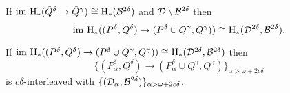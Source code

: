 
\begin{lemma}
    If $\mathrm{im}~\mathrm{H}_*(\hat{Q}^\delta\to\hat{Q}^\gamma)\cong\mathrm{H}_*({\mathcal{B}}^{2\delta})$ and ${\mathcal{D}}\setminus{\mathcal{B}}^{2\delta}$ then
    \[\mathrm{im}~\mathrm{H}_*((P^\delta, Q^\delta)\to (P^\delta\cup Q^\gamma, Q^\gamma))\cong \mathrm{H}_*({\mathcal{D}}^{2\delta}, {\mathcal{B}}^{2\delta}). \]
\end{lemma}

\begin{theorem}
    If $\mathrm{im}~\mathrm{H}_*((P^\delta, Q^\delta)\to (P^\delta\cup Q^\gamma, Q^\gamma))\cong \mathrm{H}_*({\mathcal{D}}^{2\delta}, {\mathcal{B}}^{2\delta})$ then \[\{(P_\alpha^\delta, Q^\delta)\to (P_\alpha^\delta\cup Q^\gamma, Q^\gamma)\}_{\alpha > \omega+2c\delta}\] is $c\delta$-interleaved with $\{({\mathcal{D}}_\alpha, {\mathcal{B}}^{2\delta})\}_{\alpha > \omega +2c\delta}$.
\end{theorem}
